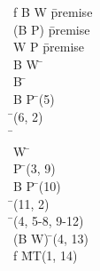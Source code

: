 \documentclass{article}
\begin{document}
\begin{proofbox}
\: f \rightarrow B \lor W \= \hbox{premise} \\
\: \lnot (B \lor P) \= \hbox{premise} \\
\: W \rightarrow P \= \hbox{premise} \\
\open
\: B \lor W \= \asm \\
\openAlt
\: B \= \asm \\
\: B \lor P \= \orintro(5) \\
\: \bot \= \bottomintro(6, 2) \\
\: \bot \=  \\
\splitAlt
\: W \= \asm \\
\: P \= \implieselim(3, 9) \\
\: B \lor P \= \orintro(10) \\
\: \bot \= \bottomintro(11, 2) \\
\closeAlt
\: \bot \= \orelim(4, 5-8, 9-12) \\
\close
\: \lnot (B \lor W) \= \notintro(4, 13) \\
\: \lnot f \= MT(1, 14) \\
\end{proofbox}
\end{document}
